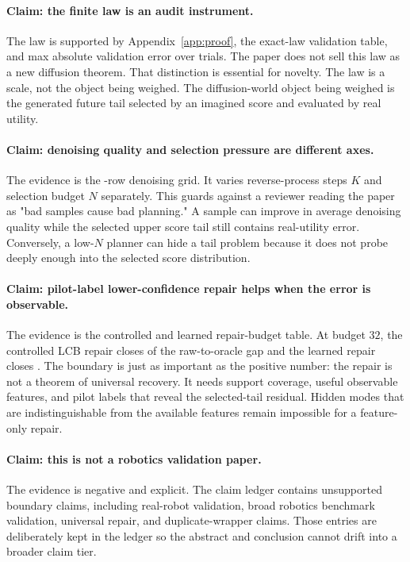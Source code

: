 \documentclass{article}
\begin{document}
\paragraph{Claim: the finite law is an audit instrument.}
The law is supported by Appendix~\ref{app:proof}, the exact-law validation
table, and max absolute validation error \VFourDWMExactLawMaxError{} over
\VFourDWMLawTrials{} trials. The paper does not sell this law as a new
diffusion theorem. That distinction is essential for novelty. The law is a
scale, not the object being weighed. The diffusion-world object being weighed
is the generated future tail selected by an imagined score and evaluated by
real utility.

\paragraph{Claim: denoising quality and selection pressure are different
axes.}
The evidence is the \VFourDWMDenoisingRows{}-row denoising grid. It varies
reverse-process steps $K$ and selection budget $N$ separately. This guards
against a reviewer reading the paper as "bad samples cause bad planning." A
sample can improve in average denoising quality while the selected upper score
tail still contains real-utility error. Conversely, a low-$N$ planner can hide
a tail problem because it does not probe deeply enough into the selected
score distribution.

\paragraph{Claim: pilot-label lower-confidence repair helps when the error is
observable.}
The evidence is the controlled and learned repair-budget table. At budget
$32$, the controlled LCB repair closes
\VFourDWMControlledGapBThirtyTwo{} of the raw-to-oracle gap and the learned
repair closes \VFourDWMLearnedGapBThirtyTwo{}. The boundary is just as
important as the positive number: the repair is not a theorem of universal
recovery. It needs support coverage, useful observable features, and pilot
labels that reveal the selected-tail residual. Hidden modes that are
indistinguishable from the available features remain impossible for a
feature-only repair.

\paragraph{Claim: this is not a robotics validation paper.}
The evidence is negative and explicit. The claim ledger contains
\VFourDWMUnsupportedBoundaryClaims{} unsupported boundary claims, including
real-robot validation, broad robotics benchmark validation, universal repair,
and duplicate-wrapper claims. Those entries are deliberately kept in the
ledger so the abstract and conclusion cannot drift into a broader claim tier.
\end{document}
